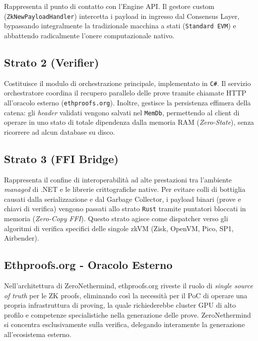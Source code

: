 \documentclass[12pt,a4paper,openright,twoside]{report}
\begin{document}
Rappresenta il punto di contatto con l'Engine API. Il gestore custom (\texttt{ZkNewPayloadHandler}) intercetta i payload in ingresso dal Consensus Layer, bypassando integralmente la tradizionale macchina a stati (\texttt{Standard EVM}) e abbattendo radicalmente l'onere computazionale nativo.

\subsection{Strato 2 (Verifier)}

Costituisce il modulo di orchestrazione principale, implementato in \texttt{C\#}. Il servizio orchestratore coordina il recupero parallelo delle prove tramite chiamate HTTP all'oracolo esterno (\texttt{ethproofs.org}). Inoltre, gestisce la persistenza effimera della catena: gli \textit{header} validati vengono salvati nel \texttt{MemDb}, permettendo al client di operare in uno stato di totale dipendenza dalla memoria RAM (\textit{Zero-State}), senza ricorrere ad alcun database su disco.

\subsection{Strato 3 (FFI Bridge)}

Rappresenta il confine di interoperabilità ad alte prestazioni tra l'ambiente \textit{managed} di .NET e le librerie crittografiche native. Per evitare colli di bottiglia causati dalla serializzazione e dal Garbage Collector, i payload binari (prove e chiavi di verifica) vengono passati allo strato \texttt{Rust} tramite puntatori bloccati in memoria (\textit{Zero-Copy FFI}). Questo strato agisce come dispatcher verso gli algoritmi di verifica specifici delle singole zkVM (Zisk, OpenVM, Pico, SP1, Airbender).

\subsection{Ethproofs.org - Oracolo Esterno}

Nell'architettura di ZeroNethermind, ethproofs.org riveste il ruolo di \textit{single source of truth} per le ZK proofs, eliminando così la necessità per il PoC di operare una propria infrastruttura di proving, la quale richiederebbe cluster GPU di alto profilo e competenze specialistiche nella generazione delle prove. ZeroNethermind si concentra esclusivamente sulla verifica, delegando interamente la generazione all'ecosistema esterno.
\end{document}
